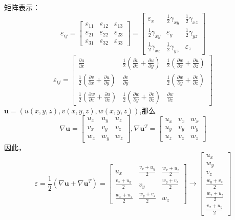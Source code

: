 \documentclass[12pt,a4paper]{article}
\begin{document}
矩阵表示：
$$
\varepsilon_{ij}=
\begin{bmatrix}
\varepsilon_{11} & \varepsilon_{12} & \varepsilon_{13} \\
\varepsilon_{21} & \varepsilon_{22} & \varepsilon_{23} \\
\varepsilon_{31} & \varepsilon_{32} & \varepsilon_{33}
\end{bmatrix}=
\begin{bmatrix}
\varepsilon_{x} & \frac{1}{2}\gamma_{xy} & \frac{1}{2}\gamma_{xz} \\
\frac{1}{2}\gamma_{xy} & \varepsilon_{y} & \frac{1}{2}\gamma_{yz} \\
\frac{1}{2}\gamma_{xz} & \frac{1}{2}\gamma_{yz} & \varepsilon_{z}
\end{bmatrix}
$$
$$
\varepsilon_{ij}=
\begin{bmatrix}
\frac{\partial u}{\partial x} & \frac{1}{2}(\frac{\partial v}{\partial x}+\frac{\partial u}{\partial y}) & \frac{1}{2}(\frac{\partial w}{\partial x}+\frac{\partial u}{\partial z}) \\
\frac{1}{2}(\frac{\partial v}{\partial x}+\frac{\partial u}{\partial y}) & \frac{\partial v}{\partial y} & \frac{1}{2}(\frac{\partial w}{\partial y}+\frac{\partial v}{\partial z}) \\
\frac{1}{2}(\frac{\partial w}{\partial x}+\frac{\partial u}{\partial z}) & \frac{1}{2}(\frac{\partial w}{\partial y}+\frac{\partial v}{\partial z}) & \frac{\partial w}{\partial z}
\end{bmatrix}
$$
$\textbf{u}=(u(x,y,z),v(x,y,z),w(x,y,z))$,那么
$$
\nabla\textbf{u}=\begin{bmatrix}
u_x & u_y & u_z \\
v_x & v_y & v_z \\
w_x & w_y & w_z 
\end{bmatrix},
\nabla\textbf{u}^T=\begin{bmatrix}
u_x & v_x & w_x \\
u_y & v_y & w_y \\
u_z & v_z & w_z 
\end{bmatrix}
$$
因此，
$$
\varepsilon = \frac{1}{2}(\nabla\textbf{u} + \nabla\textbf{u}^T) 
=\begin{bmatrix}
u_x & \frac{v_x + u_y}{2} & \frac{w_x + u_z}{2} \\
\frac{v_x + u_y}{2} & v_y & \frac{w_y + v_z}{2} \\
\frac{w_x + u_z}{2} & \frac{w_y + v_z}{2} & w_z 
\end{bmatrix}
\rightarrow 
\begin{bmatrix}
u_x \\ w_y \\ v_z \\ \frac{w_y + v_z}{2} \\ \frac{w_x + u_z}{2} \\ \frac{v_x + u_y}{2}
\end{bmatrix}
$$
\end{document}

